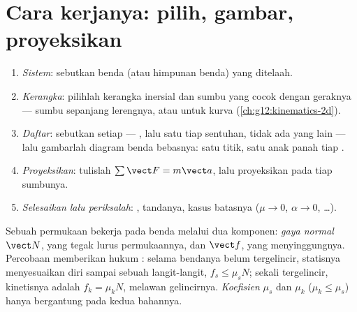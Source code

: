 \section{Cara kerjanya: pilih, gambar, proyeksikan}

\begin{method}\label{met:g12:newtons-laws:method}
\begin{enumerate}
  \item \emph{Sistem}: sebutkan benda (atau himpunan benda) yang ditelaah.
  \item \emph{Kerangka}: pilihlah kerangka inersial dan sumbu yang cocok dengan
        geraknya --- sumbu sepanjang lerengnya, atau  untuk kurva
        (\cref{ch:g12:kinematics-2d}).
  \item \emph{Daftar}: sebutkan setiap  --- , lalu satu  tiap
        sentuhan, tidak ada yang lain --- lalu gambarlah diagram benda bebasnya: satu
        titik, satu anak panah tiap .
  \item \emph{Proyeksikan}: tulislah $\sum \vect F = m\vect a$, lalu proyeksikan pada
        tiap sumbunya.
  \item \emph{Selesaikan lalu periksalah}: , tandanya, kasus batasnya
        ($\mu \to 0$, $\alpha \to 0$, \dots).
\end{enumerate}
\end{method}

\begin{definition}\label{def:g12:newtons-laws:friction}
Sebuah permukaan bekerja pada benda melalui dua komponen: \emph{gaya
normal} $\vect N$, yang tegak lurus permukaannya, dan 
$\vect f$, yang menyinggungnya. Percobaan memberikan hukum : selama bendanya
belum tergelincir,  statisnya menyesuaikan diri sampai sebuah langit-langit,
$f_s \leq \mu_s N$; sekali tergelincir,  kinetisnya adalah $f_k = \mu_k N$,
melawan gelincirnya. \emph{Koefisien }%
 $\mu_s$ dan $\mu_k$ ($\mu_k \leq \mu_s$) hanya bergantung
pada kedua bahannya.
\end{definition}


